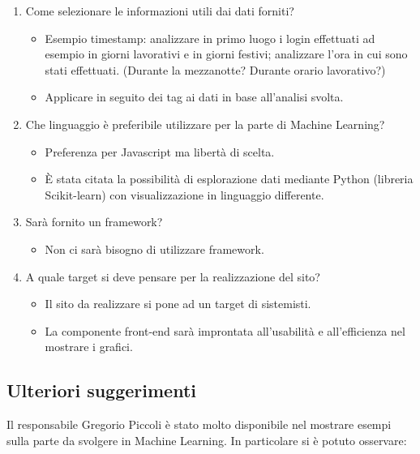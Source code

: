 \begin{enumerate}
	\item Come selezionare le informazioni utili dai dati forniti?
	\begin{itemize}
		\item Esempio timestamp: analizzare in primo luogo i login effettuati ad esempio in giorni lavorativi e in giorni festivi; analizzare l'ora in cui sono stati effettuati. (Durante la mezzanotte? Durante orario lavorativo?)
		\item Applicare in seguito dei tag ai dati in base all'analisi svolta.
	\end{itemize}

	\item Che linguaggio è preferibile utilizzare per la parte di Machine Learning?
	\begin{itemize}
		\item Preferenza per Javascript ma libertà di scelta.
		\item \`E stata citata la possibilità di esplorazione dati mediante Python (libreria Scikit-learn) con visualizzazione in linguaggio differente.
	\end{itemize}

	\item Sarà fornito un framework?
	\begin{itemize}
		\item Non ci sarà bisogno di utilizzare framework.
	\end{itemize}

	\item A quale target si deve pensare per la realizzazione del sito?
	\begin{itemize}
		\item Il sito da realizzare si pone ad un target di sistemisti.
		\item La componente front-end sarà improntata all'usabilità e all'efficienza nel mostrare i grafici.
	\end{itemize}

\end{enumerate}

\subsection{Ulteriori suggerimenti}

Il responsabile Gregorio Piccoli è stato molto disponibile nel mostrare esempi sulla parte da svolgere in Machine Learning. In particolare si è potuto osservare:

